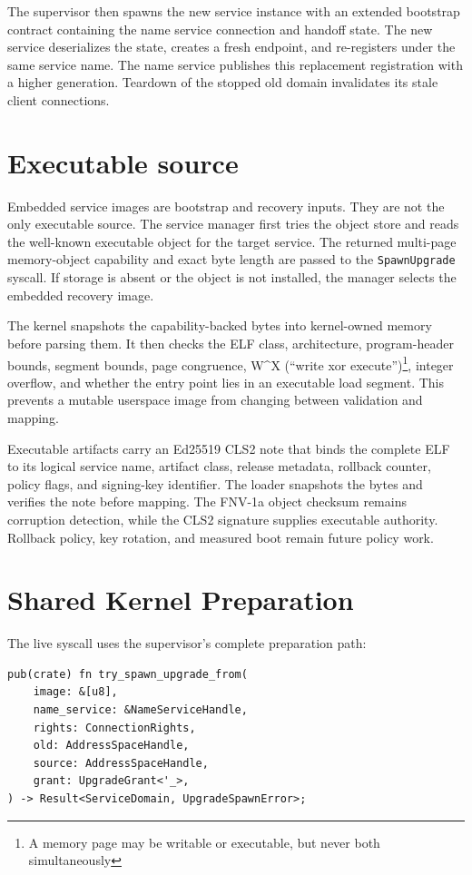 The supervisor then spawns the new service instance with an extended bootstrap
contract containing the name service connection and handoff state. The new
service deserializes the state, creates a fresh endpoint, and re-registers under
the same service name. The name service publishes this replacement registration
with a higher generation. Teardown of the stopped old domain invalidates its
stale client connections.

\section{Executable source}

Embedded service images are bootstrap and recovery inputs. They are not the
only executable source. The service manager first tries the object store and
reads the well-known executable object for the target service. The returned
multi-page memory-object capability and exact byte length are passed to
the \texttt{SpawnUpgrade} syscall. If storage is absent or the object is not installed,
the manager selects the embedded recovery image.

The kernel snapshots the capability-backed bytes into kernel-owned memory before
parsing them. It then checks the ELF class, architecture, program-header bounds,
segment bounds, page congruence, W\^{}X (``write xor execute'')\footnote{A memory
page may be writable or executable, but never both simultaneously}, integer
overflow, and whether the entry point lies in an executable load segment.
This prevents a mutable userspace image from changing between validation and 
mapping.

Executable artifacts carry an Ed25519 CLS2 note that binds the complete ELF to
its logical service name, artifact class, release metadata, rollback counter,
policy flags, and signing-key identifier. The loader snapshots the bytes and
verifies the note before mapping. The FNV-1a object checksum remains corruption
detection, while the CLS2 signature supplies executable authority. Rollback policy, key rotation, and measured
boot remain future policy work.

\section{Shared Kernel Preparation}

The live syscall uses the supervisor's complete preparation path:

\begin{lstlisting}[style=rustCode]
pub(crate) fn try_spawn_upgrade_from(
    image: &[u8],
    name_service: &NameServiceHandle,
    rights: ConnectionRights,
    old: AddressSpaceHandle,
    source: AddressSpaceHandle,
    grant: UpgradeGrant<'_>,
) -> Result<ServiceDomain, UpgradeSpawnError>;
\end{lstlisting}

